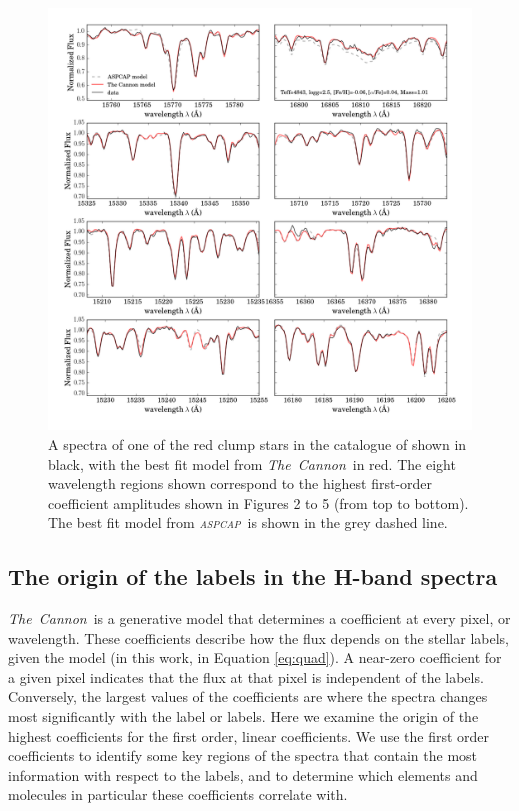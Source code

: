 \documentclass[12pt, preprint]{aastex}
\newcommand{\project}[1]{\textsl{#1}}
\newcommand{\tc}{\project{The~Cannon}}
\newcommand{\aspcap}{\project{\textsc{aspcap}}}
\begin{document}
\begin{figure}[hp]
\centering
      \includegraphics[scale=0.5]{./plots/spectra_fits_7.png}
  \caption{A spectra of one of the red clump stars in the catalogue of \citet{Bovy2014} shown in black, with the best fit model from \tc\ in red. The eight wavelength regions shown correspond to the highest first-order coefficient amplitudes shown in Figures 2 to 5 (from top to bottom). The best fit model from \aspcap\ is shown in the grey dashed line.}
\label{fig:spectra}
\end{figure}


\subsection{The origin of the labels in the H-band spectra}


\tc\ is a generative model that determines a coefficient at every pixel, or wavelength. These coefficients describe how the flux depends on the stellar labels, given the model (in this work, in Equation \ref{eq:quad}).   A near-zero coefficient for a given pixel indicates that the flux at that pixel is independent of the labels. Conversely, the largest values of the coefficients are where the spectra changes most significantly with the label or labels. Here we examine the origin of the highest coefficients for the first order, linear coefficients. We use the first order coefficients to identify some key regions of the spectra that contain the most information with respect to the labels, and to determine which elements and molecules in particular these coefficients correlate with. 
\end{document}
